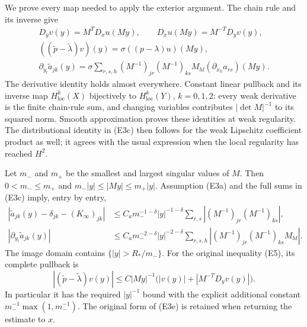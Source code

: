 \documentclass[
  11pt,
]{article}
\begin{document}
We prove every map needed to apply the exterior argument. The chain rule
and its inverse give \[
 \begin{gathered}
 D_yv(y)=M^TD_xu(My),\qquad D_xu(My)=M^{-T}D_yv(y),\\
 ((\widetilde p-\widetilde\lambda)v)(y)
             =\sigma((p-\lambda)u)(My),\\
 \partial_{y_l}\widetilde a_{jk}(y)
   =\sigma\sum_{r,s,h}(M^{-1})_{jr}(M^{-1})_{ks}M_{hl}
                         (\partial_{x_h}a_{rs})(My).
 \end{gathered}                                                   \tag{E3c}
\] The derivative identity holds almost everywhere. Constant linear
pullback and its inverse map \(H^k_{\mathrm{loc}}(X)\) bijectively to
\(H^k_{\mathrm{loc}}(Y)\), \(k=0,1,2\): every weak derivative is the
finite chain-rule sum, and changing variables contributes
\(|\det M|^{-1}\) to its squared norm. Smooth approximation proves these
identities at weak regularity. The distributional identity in (E3c) then
follows for the weak Lipschitz coefficient product as well; it agrees
with the usual expression when the local regularity has reached \(H^2\).

Let \(m_-\) and \(m_+\) be the smallest and largest singular values of
\(M\). Then \(0<m_-\leq m_+\) and \(m_-|y|\leq|My|\leq m_+|y|\).
Assumption (E3a) and the full sums in (E3c) imply, entry by entry, \[
 \begin{split}
 |\widetilde a_{jk}(y)-\delta_{jk}-(K_\infty)_{jk}|
 &\leq C_a m_-^{-1-\delta}|y|^{-1-\delta}
                 \sum_{r,s}|(M^{-1})_{jr}(M^{-1})_{ks}|,\\
 |\partial_{y_l}\widetilde a_{jk}(y)|
 &\leq C_a m_-^{-2-\delta}|y|^{-2-\delta}
                 \sum_{r,s,h}|(M^{-1})_{jr}(M^{-1})_{ks}M_{hl}|.
 \end{split}                                                     \tag{E3d}
\] The image domain contains \(\{|y|>R_*/m_-\}\). For the original
inequality (E5), its complete pullback is \[
 |(\widetilde p-\widetilde\lambda)v(y)|
 \leq C|My|^{-1}\bigl(|v(y)|+|M^{-T}D_yv(y)|\bigr).             \tag{E3e}
\] In particular it has the required \(|y|^{-1}\) bound with the
explicit additional constant \(m_-^{-1}\max(1,m_-^{-1})\). The original
form of (E3e) is retained when returning the estimate to \(x\).
\end{document}

